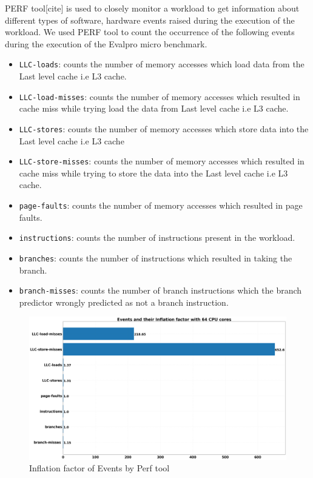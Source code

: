 \documentclass[sigconf]{acmart}
\begin{document}
PERF tool[cite] is used to closely monitor a workload to get information about different types of software, hardware events raised during the execution of the workload. We used  PERF tool to count the occurrence of the following events during the execution of the Evalpro micro benchmark.
\begin{itemize}
\item {\texttt{LLC-loads}}: counts the number of memory accesses which load data from the  Last level cache  i.e L3 cache.
 \item {\texttt{LLC-load-misses}}: counts the number of memory accesses which resulted in cache miss while trying load  the data from Last level cache  i.e L3 cache.
\item {\texttt{LLC-stores}}:  counts the number of memory accesses which store data into the  Last level cache  i.e L3 cache 
\item {\texttt{LLC-store-misses}}: counts the number of memory accesses which resulted in cache miss while trying to store  the data into the Last level cache  i.e L3 cache.
\item {\texttt{page-faults}}: counts the number of memory accesses which resulted in page faults.
\item {\texttt{instructions}}: counts the number of instructions present in the workload.
\item {\texttt{branches}}: counts the number of instructions which resulted in taking the branch.
\item {\texttt{branch-misses}}: counts the number of branch instructions which the branch predictor wrongly predicted as not a branch instruction.
\end{itemize}

\begin{figure}[!htb]
  \centering
  \includegraphics[width=\linewidth]{Pictures/perf_tool_results.png}
  \caption{Inflation factor of Events by Perf tool}
  \label{perf_results}
\end{figure}
\end{document}
